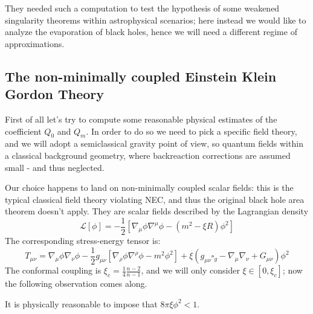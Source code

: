 They needed such a computation to test the hypothesis of some weakened singularity theorems within astrophysical scenarios; here instead we would like to analyze the evaporation of black holes, hence we will need a different regime of approximations.

\subsection{The non-minimally coupled Einstein Klein Gordon Theory}
\label{subsec:non-min-EKG-theory}
First of all let's try to compute some reasonable physical estimates of the coefficient \(Q_0\) and \(Q_m\). In order to do so we need to pick a specific field theory, and we will adopt a semiclassical gravity point of view, so quantum fields within a classical background geometry, where backreaction corrections are assumed small - and thus neglected.

Our choice happens to land on non-minimally coupled scalar fields: this is the typical classical field theory violating NEC, and thus the original black hole area theorem doesn't apply. They are scalar fields described by the Lagrangian density
\[
\mathcal{L}[\phi] = -\frac{1}{2}\left[\nabla_{\mu}\phi\nabla^{\mu}\phi   - (m^2 - \xi R)\phi^2\right]
\]
The corresponding stress-energy tensor is:
\begin{equation}
    T_{\mu\nu} = \nabla_{\mu}\phi\nabla_{\nu}\phi - \frac{1}{2}g_{\mu\nu}\left[\nabla_{\rho}\phi\nabla^{\rho}\phi - m^2\phi^2\right] + \xi\left(g_{\mu\nu}\square_g - \nabla_{\mu}\nabla_{\nu} + G_{\mu\nu}\right)\phi^2
\end{equation}
The conformal coupling is \(\xi_c = \frac{1}{4}\frac{n - 2}{n - 1}\), and we will only consider \(\xi\in [0,\xi_c]\);
now the following observation comes along.

\begin{prop}
    It is physically reasonable to impose that \(8\pi\xi\phi^2 < 1\).
\end{prop}

